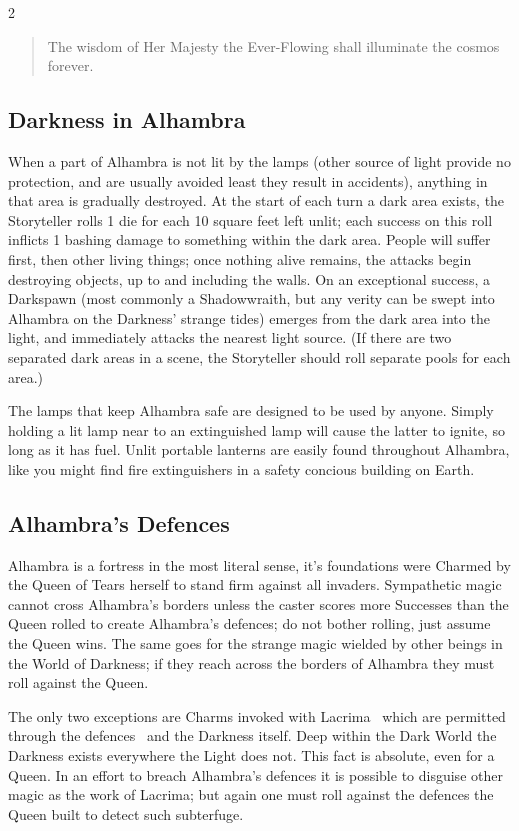 \begin{multicols}{2}
\begin{quotation}
    The wisdom of Her Majesty the Ever-Flowing shall illuminate the cosmos forever. \end{quotation}
    
\subsection*{Darkness in Alhambra}

When a part of Alhambra is not lit by the lamps (other source of light provide no protection, and are usually avoided least they result in accidents), anything in that area is gradually destroyed. At the start of each turn a dark area exists, the Storyteller rolls 1 die for each 10 square feet left unlit; each success on this roll inflicts 1 bashing damage to something within the dark area.  People will suffer first, then other living things; once nothing alive remains, the attacks begin destroying objects, up to and including the walls. On an exceptional success, a Darkspawn (most commonly a Shadowwraith, but any verity can be swept into Alhambra on the Darkness' strange tides) emerges from the dark area into the light, and immediately attacks the nearest light source. (If there are two separated dark areas in a scene, the Storyteller should roll separate pools for each area.)

The lamps that keep Alhambra safe are designed to be used by anyone. Simply holding a lit lamp near to an extinguished lamp will cause the latter to ignite, so long as it has fuel. Unlit portable lanterns are easily found throughout Alhambra, like you might find fire extinguishers in a safety concious building on Earth. 

\subsection*{Alhambra's Defences}

Alhambra is a fortress in the most literal sense, it's foundations were Charmed by the Queen of Tears herself to stand firm against all invaders. Sympathetic magic cannot cross Alhambra's borders unless the caster scores more Successes than the Queen rolled to create Alhambra's defences; do not bother rolling, just assume the Queen wins. The same goes for the strange magic wielded by other beings in the World of Darkness; if they reach across the borders of Alhambra they must roll against the Queen.  

The only two exceptions are Charms invoked with Lacrima \textendash\, which are permitted through the defences \textendash\, and the Darkness itself. Deep within the Dark World the Darkness exists everywhere the Light does not. This fact is absolute, even for a Queen. In an effort to breach Alhambra's defences it is possible to disguise other magic as the work of Lacrima; but again one must roll against the defences the Queen built to detect such subterfuge. 


\end{multicols}
